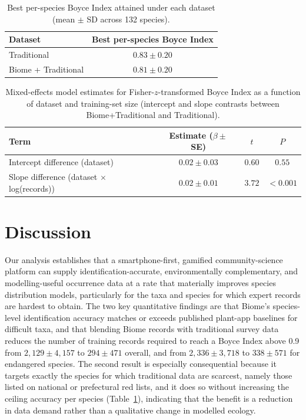 \documentclass[11pt]{article}
\begin{document}
\begin{table}[htbp]
\centering
\caption{Best per-species Boyce Index attained under each dataset (mean $\pm$ SD across 132 species).}
\label{tab:bestbi}
\begin{tabular}{lc}
\toprule
Dataset & Best per-species Boyce Index \\
\midrule
Traditional & $0.83 \pm 0.20$ \\
Biome + Traditional & $0.81 \pm 0.20$ \\
\bottomrule
\end{tabular}
\end{table}

\begin{table}[htbp]
\centering
\caption{Mixed-effects model estimates for Fisher-$z$-transformed Boyce Index as a function of dataset and training-set size (intercept and slope contrasts between Biome+Traditional and Traditional).}
\label{tab:glmm}
\begin{tabular}{lccc}
\toprule
Term & Estimate ($\beta \pm$ SE) & $t$ & $P$ \\
\midrule
Intercept difference (dataset) & $0.02 \pm 0.03$ & $0.60$ & $0.55$ \\
Slope difference (dataset $\times$ log(records)) & $0.02 \pm 0.01$ & $3.72$ & $<\!0.001$ \\
\bottomrule
\end{tabular}
\end{table}

\section{Discussion}

Our analysis establishes that a smartphone-first, gamified community-science platform can supply identification-accurate, environmentally complementary, and modelling-useful occurrence data at a rate that materially improves species distribution models, particularly for the taxa and species for which expert records are hardest to obtain. The two key quantitative findings are that Biome's species-level identification accuracy matches or exceeds published plant-app baselines for difficult taxa, and that blending Biome records with traditional survey data reduces the number of training records required to reach a Boyce Index above 0.9 from $2{,}129 \pm 4{,}157$ to $294 \pm 471$ overall, and from $2{,}336 \pm 3{,}718$ to $338 \pm 571$ for endangered species. The second result is especially consequential because it targets exactly the species for which traditional data are scarcest, namely those listed on national or prefectural red lists, and it does so without increasing the ceiling accuracy per species (Table~\ref{tab:bestbi}), indicating that the benefit is a reduction in data demand rather than a qualitative change in modelled ecology.
\end{document}
